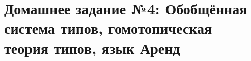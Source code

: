 \documentclass[10pt,a4paper,oneside]{article}
\begin{document}
\begin{enumerate}
\begin{comment}
\item Рассмотрим следующий код на Окамле, содержащий определения чёрчевских нумералов
и некоторых простых операций с ними:

\begin{verbatim}
let zero = fun f x -> x;;
let plus1 a = fun f -> fun x -> a f (f x);;
let power m n = n m;;

let two = plus1 (plus1 zero);;
let two2 = fun f x -> f (f x);;

let e  = power two two;;          (* не компилируется *)
let e2 = power two2 two2;;        (* компилируется и работает *)
\end{verbatim}

Разберите вывод типов в этом фрагменте (относительно типовой системы Хиндли-Милнера) и поясните, почему:
\begin{enumerate}
\item определение $e2$ компилируется и работает (предъявите доказательство типа в системе HM);
\item определение $e$ не компилируется (например, примените алгоритм W и покажите шаг, где он выведет ошибку).
\end{enumerate}
\end{comment}

\end{enumerate}

\section*{Домашнее задание №4: Обобщённая система типов, гомотопическая теория типов, язык Аренд}
\end{document}
